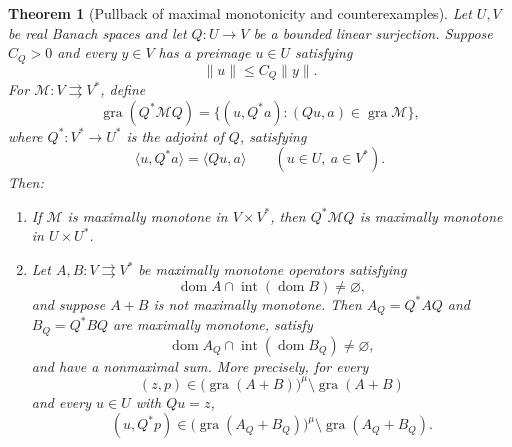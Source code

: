 \documentclass[11pt]{article}
\newcommand{\gra}{\operatorname{gra}}
\newcommand{\dom}{\operatorname{dom}}
\newcommand{\pair}[2]{\langle #1,#2\rangle}
\newtheorem{theorem}{Theorem}
\theoremstyle{definition}
\theoremstyle{remark}
\begin{document}
\begin{theorem}[Pullback of maximal monotonicity and counterexamples]
\label{lem:surjection-transport}
Let $U,V$ be real Banach spaces and let $Q:U\to V$ be a bounded linear surjection. Suppose $C_Q>0$ and every $y\in V$ has a preimage $u\in U$ satisfying
\[
\|u\|\le C_Q\|y\|.
\]
For $\mathcal M:V\rightrightarrows V^*$, define
\[
\gra(Q^*\mathcal M Q)
=
\{(u,Q^*a):(Qu,a)\in\gra\mathcal M\},
\]
where $Q^*:V^*\to U^*$ is the adjoint of $Q$, satisfying
\[
\pair{u}{Q^*a}=\pair{Qu}{a}
\qquad(u\in U,\ a\in V^*).
\]
Then:
\begin{enumerate}
\renewcommand{\theenumi}{\roman{enumi}}
\renewcommand{\labelenumi}{(\theenumi)}
\item\label{thm:pullback-maximality} If $\mathcal M$ is maximally monotone in $V\times V^*$, then $Q^*\mathcal M Q$ is maximally monotone in $U\times U^*$.
\item\label{thm:pullback-counterexamples} Let $A,B:V\rightrightarrows V^*$ be maximally monotone operators satisfying
\[
\dom A\cap\operatorname{int}(\dom B)\ne\varnothing,
\]
and suppose $A+B$ is not maximally monotone. Then $A_Q=Q^*AQ$ and $B_Q=Q^*BQ$ are maximally monotone, satisfy
\[
\dom A_Q\cap\operatorname{int}(\dom B_Q)\ne\varnothing,
\]
and have a nonmaximal sum. More precisely, for every
\[
(z,p)\in\bigl(\gra(A+B)\bigr)^\mu\setminus\gra(A+B)
\]
and every $u\in U$ with $Qu=z$,
\begin{equation}
(u,Q^*p)\in\bigl(\gra(A_Q+B_Q)\bigr)^\mu\setminus\gra(A_Q+B_Q).
\label{eq:pullback-witness}
\end{equation}
\end{enumerate}
\end{theorem}
\end{document}
